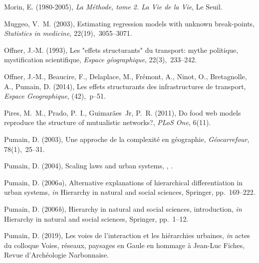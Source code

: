 \documentclass[11pt]{article}
\begin{document}
\begin{thebibliography}{xx}
Morin, E. (1980-2005), {\em La M{\'e}thode, tome 2. La Vie de la Vie}, Le
  Seuil.

Muggeo, V.~M. (2003), Estimating regression models with unknown break-points,
  {\em Statistics in medicine}, 22(19),~3055--3071.

Offner, J.-M. (1993), Les "effets structurants" du transport: mythe politique,
  mystification scientifique, {\em Espace g{\'e}ographique}, 22(3),~233--242.

Offner, J.-M., Beaucire, F., Delaplace, M., Fr{\'e}mont, A., Ninot, O.,
  Bretagnolle, A., Pumain, D. (2014), Les effets structurants des
  infrastructures de transport, {\em Espace Geographique}, (42),~p--51.

Pires, M.~M., Prado, P.~I., Guimar{\~a}es~Jr, P.~R. (2011), Do food web models
  reproduce the structure of mutualistic networks?, {\em PLoS One}, 6(11).

Pumain, D. (2003), Une approche de la complexit{\'e} en g{\'e}ographie, {\em
  G{\'e}ocarrefour}, 78(1),~25--31.

Pumain, D. (2004), Scaling laws and urban systems, , .

Pumain, D. (2006{\em a}), Alternative explanations of hierarchical
  differentiation in urban systems, {\em in} Hierarchy in natural and social
  sciences, Springer, pp.~169--222.

Pumain, D. (2006{\em b}), Hierarchy in natural and social sciences,
  introduction, {\em in} Hierarchy in natural and social sciences, Springer,
  pp.~1--12.

Pumain, D. (2019), {Les voies de l'interaction et les hi{\'e}rarchies
  urbaines}, {\em in} {actes du colloque Voies, r{\'e}seaux, paysages en Gaule
  en hommage {\`a} Jean-Luc Fiches, Revue d'Arch{\'e}ologie Narbonnaise}.
\newline{}


\end{thebibliography}
\end{document}
